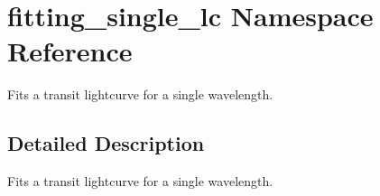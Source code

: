 \hypertarget{namespacefitting__single__lc}{}\section{fitting\+\_\+single\+\_\+lc Namespace Reference}
\label{namespacefitting__single__lc}


Fits a transit lightcurve for a single wavelength.  




\subsection{Detailed Description}
Fits a transit lightcurve for a single wavelength. 